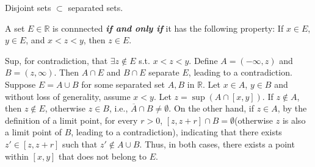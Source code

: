\begin{remark}[pma 2.46]
Disjoint sets $\subset$ separated sets.
\end{remark}

\begin{theorem}[pma 2.47]
A set $E\in \mathbb{R}$ is connnected \textbf{\emph{if and only if}} it has the following property: If $x\in E$, $y\in E$, and $x<z<y$, then $z\in E$.
\end{theorem}
\begin{hardproof}
\forward Sup, for contradiction, that $\exists z\notin E$ s.t. $x<z<y$. Define $A=(-\infty,z)$ and $B=(z,\infty)$. Then $A\cap E$ and $B\cap E$ separate $E$, leading to a contradiction.
\backward Suppose $E=A\cup B$ for some separated set $A,B$ in $\mathbb{R}$. Let $x\in A$, $y\in B$ and without loss of generality, assume $x<y$. Let $z=\sup(A\cap [x,y])$. If $z\notin A$, then $z\notin E$, otherwise $z\in B$, i.e., $\overline{A}\cap B \neq \emptyset$. On the other hand, if $z\in A$, by the definition of a limit point, for every $r>0$, $[z,z+r]\cap B=\emptyset$(otherwise $z$ is also a limit point of $B$, leading to a contradiction), indicating that there exists $z'\in [z,z+r]$ such that $z'\notin A\cup B$. Thus, in both cases, there exists a point within $[x,y]$ that does not belong to $E$.
\end{hardproof}

\clearpage